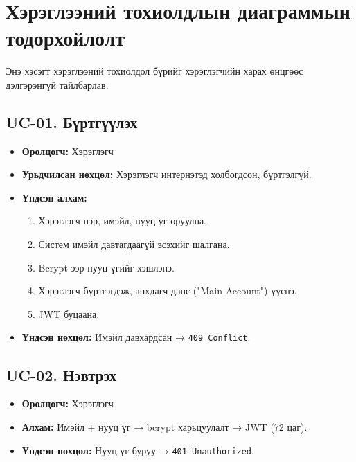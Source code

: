 \section{Хэрэглээний тохиолдлын диаграммын тодорхойлолт}
Энэ хэсэгт хэрэглээний тохиолдол бүрийг хэрэглэгчийн харах өнцгөөс дэлгэрэнгүй тайлбарлав.

\subsection{UC-01. Бүртгүүлэх}
\begin{itemize}
    \item \textbf{Оролцогч:} Хэрэглэгч
    \item \textbf{Урьдчилсан нөхцөл:} Хэрэглэгч интернэтэд холбогдсон, бүртгэлгүй.
    \item \textbf{Үндсэн алхам:}
    \begin{enumerate}
        \item Хэрэглэгч нэр, имэйл, нууц үг оруулна.
        \item Систем имэйл давтагдаагүй эсэхийг шалгана.
        \item Bcrypt-ээр нууц үгийг хэшлэнэ.
        \item Хэрэглэгч бүртгэгдэж, анхдагч данс ("Main Account") үүснэ.
        \item JWT буцаана.
    \end{enumerate}
    \item \textbf{Үндсэн нөхцөл:} Имэйл давхардсан → \texttt{409 Conflict}.
\end{itemize}

\subsection{UC-02. Нэвтрэх}
\begin{itemize}
    \item \textbf{Оролцогч:} Хэрэглэгч
    \item \textbf{Алхам:} Имэйл + нууц үг → bcrypt харьцуулалт → JWT (72 цаг).
    \item \textbf{Үндсэн нөхцөл:} Нууц үг буруу → \texttt{401 Unauthorized}.
\end{itemize}

